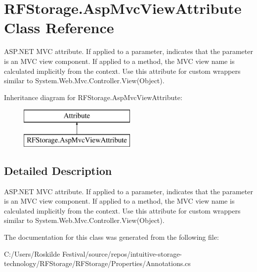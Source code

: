 \section{R\+F\+Storage.\+Asp\+Mvc\+View\+Attribute Class Reference}
\label{class_r_f_storage_1_1_asp_mvc_view_attribute}


A\+S\+P.\+N\+ET M\+VC attribute. If applied to a parameter, indicates that the parameter is an M\+VC view component. If applied to a method, the M\+VC view name is calculated implicitly from the context. Use this attribute for custom wrappers similar to {\ttfamily System.\+Web.\+Mvc.\+Controller.\+View(\+Object)}.  


Inheritance diagram for R\+F\+Storage.\+Asp\+Mvc\+View\+Attribute\+:\begin{figure}[H]
\begin{center}
\leavevmode
\includegraphics[height=2.000000cm]{class_r_f_storage_1_1_asp_mvc_view_attribute}
\end{center}
\end{figure}


\subsection{Detailed Description}
A\+S\+P.\+N\+ET M\+VC attribute. If applied to a parameter, indicates that the parameter is an M\+VC view component. If applied to a method, the M\+VC view name is calculated implicitly from the context. Use this attribute for custom wrappers similar to {\ttfamily System.\+Web.\+Mvc.\+Controller.\+View(\+Object)}. 



The documentation for this class was generated from the following file\+:\begin{DoxyCompactItemize}
\item 
C\+:/\+Users/\+Roskilde Festival/source/repos/intuitive-\/storage-\/technology/\+R\+F\+Storage/\+R\+F\+Storage/\+Properties/Annotations.\+cs\end{DoxyCompactItemize}
